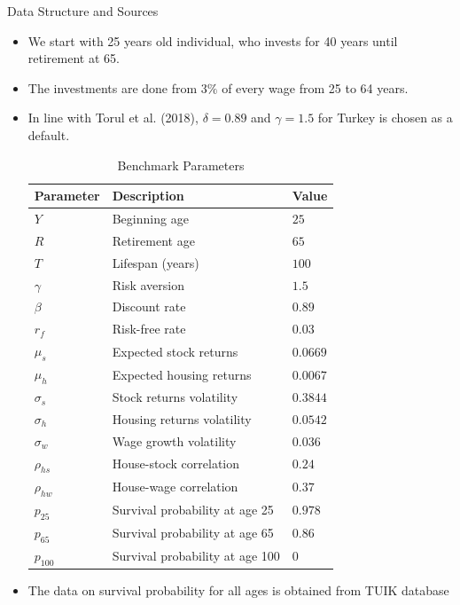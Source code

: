 \documentclass{beamer}
\begin{document}
\begin{frame}[allowframebreaks]{Data Structure and Sources}
\begin{itemize}
\framebreak

	\item We start with 25 years old individual, who invests for 40 years until retirement at 65.
	\item The investments are done from $3\%$ of every wage from 25 to 64 years.
	\item In line with Torul et al. (2018), $\delta = 0.89$ and $\gamma = 1.5$ for Turkey is chosen as a default. 

\framebreak

\begin{table}
	\centering
	\caption{Benchmark Parameters}
	\begin{tabular}[c]{lll}
		\hline
		Parameter&Description&Value\\
		\hline
		$Y$&Beginning age&$25$\\
		$R$&Retirement age&$65$\\
		$T$&Lifespan (years)&$100$\\
		$\gamma$&Risk aversion&$1.5$\\
		$\beta$&Discount rate&$0.89$\\
		$r_f$&Risk-free rate&$0.03$\\
		\hline
		$\mu_s$&Expected stock returns&$0.0669$\\
		$\mu_h$&Expected housing returns&$0.0067$\\
		$\sigma_s$&Stock returns volatility&$0.3844$\\
		$\sigma_h$&Housing returns volatility&$0.0542$\\
		$\sigma_w$&Wage growth volatility&$0.036$\\
		$\rho_{hs}$&House-stock correlation&$0.24$\\
		$\rho_{hw}$&House-wage correlation&$0.37$\\
		\hline
		$p_{25}$&Survival probability at age 25&$0.978$\\
		$p_{65}$&Survival probability at age 65&$0.86$\\
		$p_{100}$&Survival probability at age 100&$0$\\	
		\hline
	\end{tabular}
\end{table}

\framebreak 
	\item The data on survival probability for all ages is obtained from TUIK database


\end{itemize}
\end{frame}
\end{document}
